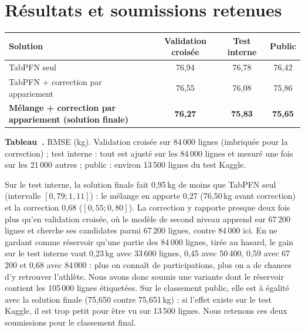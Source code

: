 \documentclass[11pt,a4paper]{article}
\newcommand{\kg}{\,kg}
\newenvironment{tableau}{\par\smallskip\noindent\begin{minipage}{\linewidth}\centering}{\end{minipage}\par\smallskip}
\newcounter{tab}
\newcommand{\legende}[2]{\refstepcounter{tab}\label{#1}{\small\textbf{Tableau~\thetab.} #2\par}}
\begin{document}
\section{Résultats et soumissions retenues}\label{sec:resultats}

\begin{tableau}\small
\begin{tabular}{@{}lccc@{}}
\toprule
Solution & Validation croisée & Test interne & Public \\
\midrule
TabPFN seul & 76,94 & 76,78 & 76,42 \\
TabPFN + correction par appariement & 76,55 & 76,08 & 75,86 \\
\textbf{Mélange + correction par appariement (solution finale)} & \textbf{76,27} & \textbf{75,83} & \textbf{75,65} \\
\bottomrule
\end{tabular}\par\vspace{2pt}
\legende{tab:soumissions}{RMSE (kg). Validation croisée sur 84\,000 lignes (imbriquée pour la correction) ; test
interne : tout est ajusté sur les 84\,000 lignes et mesuré une fois sur les 21\,000 autres ; public : environ
13\,500 lignes du test Kaggle.}
\end{tableau}

Sur le test interne, la solution finale fait 0,95\kg{} de moins que TabPFN seul (intervalle $[0{,}79 ; 1{,}11]$) :
le mélange en apporte 0,27 (76,50\kg{} avant correction) et la correction 0,68 ($[0{,}55 ; 0{,}80]$). La
correction y rapporte presque deux fois plus qu'en validation croisée, où le modèle de second niveau apprend
sur 67\,200 lignes et cherche ses candidates parmi 67\,200 lignes, contre 84\,000 ici. En ne gardant comme
réservoir qu'une partie des 84\,000 lignes, tirée au hasard, le gain sur le test interne vaut 0,23\kg{} avec
33\,600 lignes, 0,45 avec 50\,400, 0,59 avec 67\,200 et 0,68 avec 84\,000 : plus on connaît de participations,
plus on a de chances d'y retrouver l'athlète. Nous avons donc soumis une variante dont le réservoir contient les
105\,000 lignes étiquetées. Sur le classement public, elle est à égalité avec la solution finale (75,650 contre
75,651\kg) : si l'effet existe sur le test Kaggle, il est trop petit pour être vu sur 13\,500 lignes. Nous
retenons ces deux soumissions pour le classement final.

\end{document}
